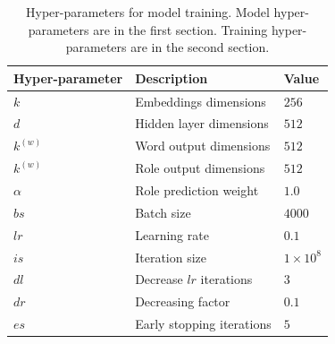 \documentclass[a4paper]{article}
\begin{document}
\begin{table}[t]
\centering
\begin{tabular}{l|l|l}
\textbf{Hyper-parameter} &  \textbf{Description}    &   \textbf{Value}  \\ \hline
$k$         &   Embeddings dimensions   &   $256$       \\
$d$         &   Hidden layer dimensions &   $512$       \\
$k^{(w)}$   &   Word output dimensions  &   $512$       \\
$k^{(w)}$   &   Role output dimensions  &   $512$       \\  \hline
$\alpha$    &   Role prediction weight  &   $1.0$       \\
$bs$        &   Batch size              &   $4000$      \\
$lr$        &   Learning rate           &   $0.1$       \\
$is$        &   Iteration size          &   $1 \times 10^8$ \\
$dl$        &   Decrease $lr$ iterations    &   $3$     \\
$dr$        &   Decreasing factor       &   $0.1$       \\
$es$        &   Early stopping iterations   &   $5$     \\
\end{tabular}
\caption{\label{tab:hyper} Hyper-parameters for model training. Model hyper-parameters are in the first section. Training hyper-parameters are in the second section.}
\end{table}
\end{document}
